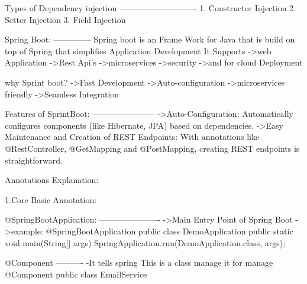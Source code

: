 Types of Dependency injection 
----------------------------
        1. Constructor Injection
        2. Setter Injection
        3. Field Injection



































        
Spring Boot:
--------------
        Spring boot is an Frame Work for Java that is build on top of Spring that simplifies Application Development
        It Supports
                ->web Application
                ->Rest Api's
                ->microservices
                ->security
                ->and for cloud Deployment


why Sprint boot?
            ->Fast Development
            ->Auto-configuration
            ->microservices friendly
            ->Seamless Integration

Features of SprintBoot:
-----------------------
                ->Auto-Configuration: Automatically configures components (like Hibernate, JPA) based on dependencies. 
                ->Easy Maintenance and Creation of REST Endpoints: With annotations like @RestController, @GetMapping and @PostMapping, creating REST endpoints is straightforward.


Annotations Explanation:

1.Core Basic Annotation:

@SpringBootApplication:
----------------------
                  ->Main Entry Point of Spring Boot
                  ->example:
                  @SpringBootApplication
                              public class DemoApplication {
                                          public static void main(String[] args) {
                                          SpringApplication.run(DemoApplication.class, args);
                                                 }
                                          }

@Component
----------
                  -It tells spring This is a class manage it for manage
                  @Component
                  public class EmailService {}

